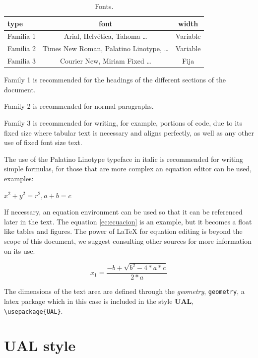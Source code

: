 \begin{table} 
	\begin{center}
	\begin{tabular}{l c c}
		\textbf{type} & \textbf{font} & \textbf{width} \\ \hline
         Familia 1 & Arial, Helvética, Tahoma  	\ldots & Variable \\
         Familia 2 & Times New Roman, Palatino  Linotype,  	\ldots & Variable  \\
         Familia 3 & Courier  New,  Miriam Fixed \ldots & Fija \\
         \hline
	\end{tabular}
	\end{center}

	\caption{\label{tab:letras}Fonts.}
\end{table}


Family 1 is recommended for the headings of the different sections of the document.

Family 2 is recommended for normal paragraphs.

Family 3 is recommended for writing, for example, portions of code, due to its fixed size where tabular text is necessary and aligns perfectly, as well as any other use of fixed font size text.

The use of the Palatino Linotype typeface in italic is recommended for writing simple formulas, for those that are more complex an equation editor can be used, examples:

$ x^2+y^2=r^2,    a+b=c$

If necessary, an equation environment can be used so that it can be referenced later in the text. The equation \ref{ec:ecuacion} is an example, but it becomes a float like tables and figures. The power of \LaTeX{} for equation editing is beyond the scope of this document, we suggest consulting other sources for more information on its use.

\begin{equation}
\label{ec:ecuacion}
    x_1= \frac{-b+\sqrt{b^2-4*a*c}}{2*a}
\end{equation}




The dimensions of the text area are defined through the \emph{geometry}, \lstinline[language=enparrafo]!geometry!, a latex package which in this case is included in the style \textbf{UAL}, \lstinline[language=enparrafo]!\usepackage{UAL}!.

\section {UAL style}

